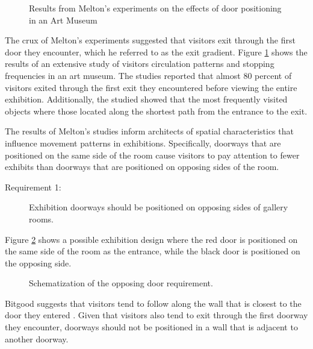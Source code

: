 \documentclass[12pt]{ucthesis}
\begin{document}
\begin{figure}[H]
 \centering
 \hspace{10 mm}
 \label{melton}
 \caption{Results from Melton's experiments on the effects of door positioning in an Art Museum}
\label{Melton-studies}
\end{figure}

The crux of Melton's experiments suggested that visitors exit through the first door they encounter, which he referred to as the exit gradient. Figure \ref{Melton-studies} shows the results of an extensive study of visitors circulation patterns and stopping frequencies in an art museum. The studies reported that almost 80 percent of visitors exited through the first exit they encountered before viewing the entire exhibition. Additionally, the studied showed that the most frequently visited objects where those located along the shortest path from the entrance to the exit. 

The results of Melton's studies inform architects of spatial characteristics that influence movement patterns in exhibitions. Specifically, doorways that are positioned on the same side of the room cause visitors to pay attention to fewer exhibits than doorways that are positioned on opposing sides of the room.

\begin{description}
\item[Requirement 1:] Exhibition doorways should be positioned on opposing sides of gallery rooms. 
\end{description}

Figure \ref{door-position} shows a possible exhibition design where the red door is positioned on the same side of the room as the entrance, while the black door is positioned on the opposing side.
\begin{figure}[H]
\centering
{}
\caption{Schematization of the opposing door requirement.}
\label{door-position}
\end{figure}

Bitgood suggests that visitors tend to follow along the wall that is closest to the door they entered \cite{Bitgood95}. Given that visitors also tend to exit through the first doorway they encounter, doorways should not be positioned in a wall that is adjacent to another doorway.  
 
\end{document}

